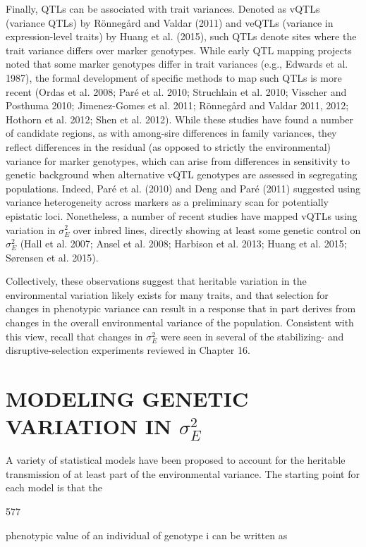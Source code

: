 \documentclass{article}
\begin{document}
Finally, QTLs can be associated with trait variances. Denoted as vQTLs (variance QTLs) by Rönnegård and Valdar (2011) and veQTLs (variance in expression-level traits) by Huang et al. (2015), such QTLs denote sites where the trait variance differs over marker genotypes. While early QTL mapping projects noted that some marker genotypes differ in trait variances (e.g., Edwards et al. 1987), the formal development of specific methods to map such QTLs is more recent (Ordas et al. 2008; Paré et al. 2010; Struchlain et al. 2010; Visscher and Posthuma 2010; Jimenez-Gomes et al. 2011; Rönnegård and Valdar 2011, 2012; Hothorn et al. 2012; Shen et al. 2012). While these studies have found a number of candidate regions, as with among-sire differences in family variances, they reflect differences in the residual (as opposed to strictly the environmental) variance for marker genotypes, which can arise from differences in sensitivity to genetic background when alternative vQTL genotypes are assessed in segregating populations. Indeed, Paré et al. (2010) and Deng and Paré (2011) suggested using variance heterogeneity across markers as a preliminary scan for potentially epistatic loci. Nonetheless, a number of recent studies have mapped vQTLs using variation in  $ \sigma_{E}^{2} $ over inbred lines, directly showing at least some genetic control on  $ \sigma_{E}^{2} $ (Hall et al. 2007; Ansel et al. 2008; Harbison et al. 2013; Huang et al. 2015; Sørensen et al. 2015).

Collectively, these observations suggest that heritable variation in the environmental variation likely exists for many traits, and that selection for changes in phenotypic variance can result in a response that in part derives from changes in the overall environmental variance of the population. Consistent with this view, recall that changes in  $ \sigma_{E}^{2} $ were seen in several of the stabilizing- and disruptive-selection experiments reviewed in Chapter 16.

\section{MODELING GENETIC VARIATION IN  $ \sigma_{E}^{2} $}
A variety of statistical models have been proposed to account for the heritable transmission of at least part of the environmental variance. The starting point for each model is that the

577

phenotypic value of an individual of genotype i can be written as
\end{document}
